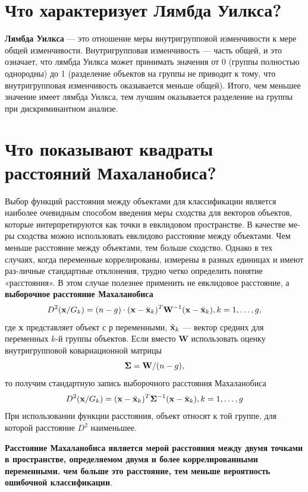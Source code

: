 \documentclass[a4paper, 12pt]{article}
\begin{document}
\section{Что характеризует Лямбда Уилкса?}
\textbf{Лямбда Уилкса} — это отношение меры внутригрупповой изменчивости к мере общей изменчивости. Внутригрупповая изменчивость — часть общей, и это означает, что лямбда Уилкса может принимать значения от 0 (группы полностью однородны) до 1 (разделение объектов на группы не приводит к тому, что внутригрупповая изменчивость оказывается меньше общей). Итого, чем меньшее значение имеет лямбда Уилкса, тем лучшим оказывается разделение на группы при дискриминантном анализе.

\section{Что показывают квадраты расстояний Махаланобиса?}
Выбор функций расстояния между объектами для классификации является наиболее очевидным способом введения меры сходства для векторов объектов, которые интерпретируются как точки в евклидовом пространстве. В качестве ме-ры сходства можно использовать евклидово расстояние между объектами. Чем меньше расстояние между объектами, тем больше сходство. Однако в тех случаях, когда переменные коррелированы, измерены в разных единицах и имеют раз-личные стандартные отклонения, трудно четко определить понятие «расстояния». В этом случае полезнее применить не евклидовое расстояние, а \textbf{выборочное расстояние Махаланобиса } 
 \begin{equation}
     D^2({\bf x}/G_k)=(n-g)\cdot ({\bf x}-\bar{\bf x}_k)^T {\bf W}^{-1} ({\bf x}-\bar{\bf x}_k), k=1,\dots,g ,
 \end{equation}
 где \textbf{x} представляет объект с $р$ переменными, $\bar{\bf x}_k$ --- вектор средних для переменных $k$-й группы объектов. Если вместо \textbf{W}   использовать оценку внутригрупповой ковариационной матрицы  
\begin{equation}
    {\bf \Sigma}={\bf W}/(n-g),
\end{equation}
то получим стандартную запись выборочного расстояния Махаланобиса
\begin{equation}
    D^2({\bf x}/G_k)= ({\bf x}-\bar{\bf x}_k)^T {\bf \Sigma}^{-1} ({\bf x}-\bar{\bf x}_k), k=1,\dots,g
\end{equation}
При использовании функции расстояния, объект относят к той группе, для которой расстояние  $D^2$ наименьшее.

\textbf{Расстояние Махаланобиса является мерой расстояния между двумя точками в пространстве, определяемом двумя и более коррелированными переменными. чем больше это расстояние, тем меньше вероятность ошибочной классификации}. 
\end{document}
